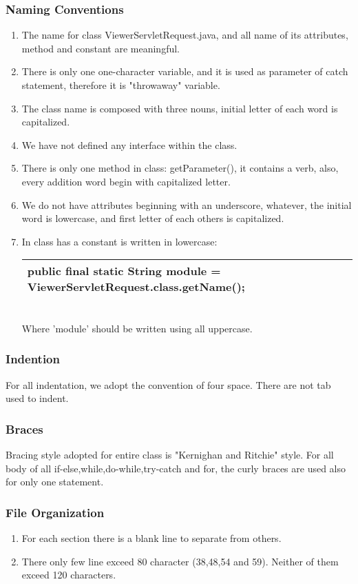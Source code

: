 \documentclass{article}
\begin{document}
\subsubsection{Naming Conventions}
\begin{enumerate}
	\item 
	The name for class ViewerServletRequest.java, and all name of its attributes, method and constant are meaningful.
	\item
	There is only one one-character variable, and it is used as parameter of catch statement, therefore it is "throwaway" variable.
	\item
	The class name is composed with three nouns, initial letter of each word is capitalized.
	\item
	We have not defined any interface within the class.
	\item 
	There is only one method in class: getParameter(), it contains a verb, also, every addition word begin with capitalized letter.
	\item
	We do not have attributes beginning with an underscore, whatever, the initial word is lowercase, and first letter of each others is capitalized.
	\item
	In class has a constant is written in lowercase:
	\begin{table}[hpb]
		\label{my-label}
		\begin{tabular}{|l|}
			\hline
			public final static String module = ViewerServletRequest.class.getName();\\
			\hline
		\end{tabular}
	\end{table} 
	\\Where 'module' should be written using all uppercase.
\end{enumerate}

\subsubsection{Indention}
For all indentation, we adopt the convention of four space. There are not tab used to indent. 
\subsubsection{Braces}
Bracing style adopted for entire class is "Kernighan and Ritchie" style. For all body of all if-else,while,do-while,try-catch and for, the curly braces are used also for only one statement.
\subsubsection{File Organization}
\begin{enumerate}
	\item
	For each section there is a blank line to separate from others.
	\item
	There only few line exceed 80 character (38,48,54 and 59). Neither of them exceed 120 characters.
\end{enumerate}
\end{document}

